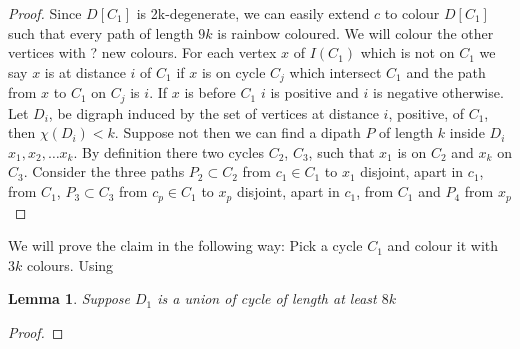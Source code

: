 \documentclass[10pt]{article}
\newcommand{\doi}[1]{\href{http://dx.doi.org/#1}{\texttt{doi:#1}}}
\theoremstyle{plain}
\newtheorem{lemma}[theorem]{Lemma}
\theoremstyle{definition}
\theoremstyle{remark}
\begin{document}
\begin{proof}
Since $D[C_1]$ is 2k-degenerate, we can easily extend $c$ to colour $D[C_1]$ such that every path of length $9k$ is rainbow coloured. 
We will colour the other vertices with ? new colours. For each vertex $x$ of $I(C_1)$ which is not on $C_1$ we say $x$ is at distance $i$
of $C_1$ if $x$ is on cycle $C_j$ which intersect $C_1$ and the path from $x$ to $C_1$ on $C_j$ is $i$. If $x$ is before $C_1$
$i$ is positive and $i$ is negative otherwise. Let $D_i$, be digraph induced by the set of vertices at distance $i$, positive, of $C_1$, then
$\chi(D_i) < k$. Suppose not then we can find a dipath $P$ of length $k$ inside $D_i$ $x_1,x_2, \dots x_k$. By definition there two cycles
$C_2$, $C_3$, such that $x_1$ is on $C_2$ and $x_k$ on $C_3$. Consider the three paths $P_2 \subset C_2$ from $c_1 \in C_1$ to $x_1$
disjoint, apart in $c_1$, from $C_1$, $P_3 \subset C_3$ from $c_p \in C_1$ to $x_p$ disjoint, apart in $c_1$, from $C_1$ and $P_4$ from $x_p$

\end{proof}

We will prove the claim in the following way: Pick a cycle $C_1$ and colour it with $3k$ colours. Using 

\begin{lemma}
Suppose $D_1$ is a union of cycle of length at least $8k$

\end{lemma}

\begin{proof}

\end{proof}



%
%
%
%
\end{document}
